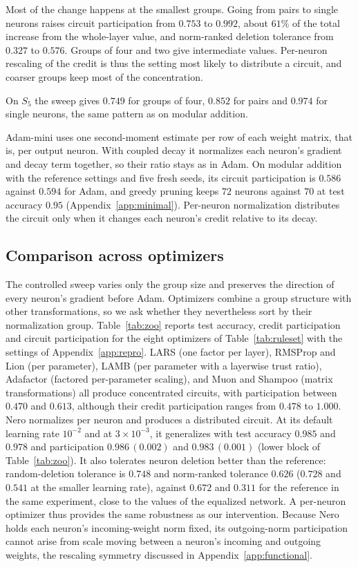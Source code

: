 \documentclass{article} %
\begin{document}
Most of the change happens at the smallest groups. Going from pairs to single neurons raises circuit participation from $0.753$ to $0.992$, about $61\%$ of the total increase from the whole-layer value, and norm-ranked deletion tolerance from $0.327$ to $0.576$. Groups of four and two give intermediate values. Per-neuron rescaling of the credit is thus the setting most likely to distribute a circuit, and coarser groups keep most of the concentration.

On $S_5$ the sweep gives $0.749$ for groups of four, $0.852$ for pairs and $0.974$ for single neurons, the same pattern as on modular addition.

Adam-mini \citep{zhang2025adammini} uses one second-moment estimate per row of each weight matrix, that is, per output neuron. With coupled decay it normalizes each neuron's gradient and decay term together, so their ratio stays as in Adam. On modular addition with the reference settings and five fresh seeds, its circuit participation is $0.586$ against $0.594$ for Adam, and greedy pruning keeps $72$ neurons against $70$ at test accuracy $0.95$ (Appendix~\ref{app:minimal}). Per-neuron normalization distributes the circuit only when it changes each neuron's credit relative to its decay.

\subsection{Comparison across optimizers}
\label{app:zoo}
The controlled sweep varies only the group size and preserves the direction of every neuron's gradient before Adam. Optimizers combine a group structure with other transformations, so we ask whether they nevertheless sort by their normalization group. Table~\ref{tab:zoo} reports test accuracy, credit participation and circuit participation for the eight optimizers of Table~\ref{tab:ruleset} with the settings of Appendix~\ref{app:repro}. LARS (one factor per layer), RMSProp and Lion (per parameter), LAMB (per parameter with a layerwise trust ratio), Adafactor (factored per-parameter scaling), and Muon and Shampoo (matrix transformations) all produce concentrated circuits, with participation between $0.470$ and $0.613$, although their credit participation ranges from $0.478$ to $1.000$. Nero normalizes per neuron and produces a distributed circuit. At its default learning rate $10^{-2}$ and at $3\times10^{-3}$, it generalizes with test accuracy $0.985$ and $0.978$ and participation $0.986\,(0.002)$ and $0.983\,(0.001)$ (lower block of Table~\ref{tab:zoo}). It also tolerates neuron deletion better than the reference: random-deletion tolerance is $0.748$ and norm-ranked tolerance $0.626$ ($0.728$ and $0.541$ at the smaller learning rate), against $0.672$ and $0.311$ for the reference in the same experiment, close to the values of the equalized network. A per-neuron optimizer thus provides the same robustness as our intervention. Because Nero holds each neuron's incoming-weight norm fixed, its outgoing-norm participation cannot arise from scale moving between a neuron's incoming and outgoing weights, the rescaling symmetry discussed in Appendix~\ref{app:functional}.
\end{document}
